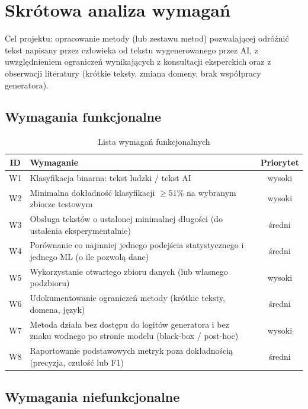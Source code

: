 \section{Skrótowa analiza wymagań}

Cel projektu: opracowanie metody (lub zestawu metod) pozwalającej odróżnić tekst napisany przez człowieka od tekstu wygenerowanego przez AI, z uwzględnieniem ograniczeń wynikających z konsultacji eksperckich oraz z obserwacji literatury (krótkie teksty, zmiana domeny, brak współpracy generatora).

\subsection{Wymagania funkcjonalne}

\begin{table}[H]
\centering
\small
\begin{tabularx}{\textwidth}{|c|X|c|}
\hline
\textbf{ID} & \textbf{Wymaganie} & \textbf{Priorytet} \\
\hline
W1 & Klasyfikacja binarna: tekst ludzki / tekst AI & wysoki \\
\hline
W2 & Minimalna dokładność klasyfikacji $\geq 51\%$ na wybranym zbiorze testowym & wysoki \\
\hline
W3 & Obsługa tekstów o ustalonej minimalnej długości (do ustalenia eksperymentalnie) & średni \\
\hline
W4 & Porównanie co najmniej jednego podejścia statystycznego i jednego ML (o ile pozwolą dane) & średni \\
\hline
W5 & Wykorzystanie otwartego zbioru danych (lub własnego podzbioru) & wysoki \\
\hline
W6 & Udokumentowanie ograniczeń metody (krótkie teksty, domena, język) & średni \\
\hline
W7 & Metoda działa bez dostępu do logitów generatora i bez znaku wodnego po stronie modelu (black-box / post-hoc) & wysoki \\
\hline
W8 & Raportowanie podstawowych metryk poza dokładnością (precyzja, czułość lub F1) & średni \\
\hline
\end{tabularx}
\caption{Lista wymagań funkcjonalnych}
\end{table}

\subsection{Wymagania niefunkcjonalne}

